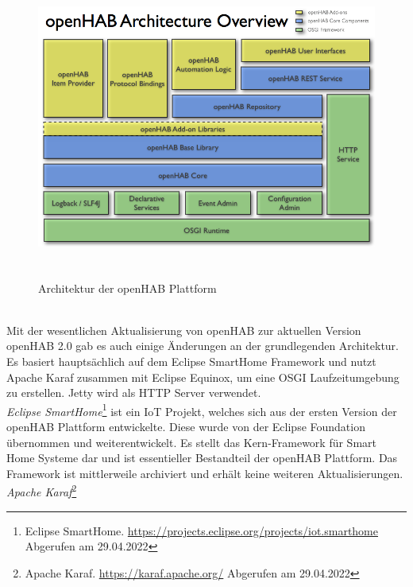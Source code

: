     \begin{figure}[hbt!]
        \centering
        \includegraphics[width=15cm,height=10cm,keepaspectratio]{images/openhab-architecture.png}
        \caption{Architektur der openHAB Plattform \cite{openHAB-architecture2013}}
        \label{fig:architectureopenHAB}
    \end{figure}
    \\
    \linebreak
    Mit der wesentlichen Aktualisierung von openHAB zur aktuellen Version openHAB 2.0 gab es auch einige Änderungen an der 
    grundlegenden Architektur. Es basiert hauptsächlich auf dem Eclipse SmartHome Framework und nutzt Apache Karaf zusammen mit 
    Eclipse Equinox, um eine \acs{OSGI} Laufzeitumgebung zu erstellen. Jetty wird als \acs{HTTP} Server verwendet. 
    \\
    \linebreak
    \textit{Eclipse SmartHome}\footnote{Eclipse SmartHome. \url{https://projects.eclipse.org/projects/iot.smarthome} Abgerufen am 29.04.2022} 
    ist ein \acs{IoT} Projekt, welches sich aus der ersten Version der openHAB Plattform entwickelte. 
    Diese wurde von der Eclipse Foundation übernommen und weiterentwickelt. Es stellt das Kern-Framework für Smart Home Systeme dar 
    und ist essentieller Bestandteil der openHAB Plattform. Das Framework ist mittlerweile archiviert und erhält keine weiteren 
    Aktualisierungen.
    \\
    \linebreak
    \textit{Apache Karaf}\footnote{Apache Karaf. \url{https://karaf.apache.org/} Abgerufen am 29.04.2022} 
